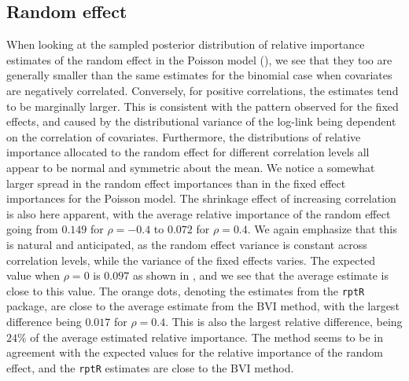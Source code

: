 \subsection{Random effect}
When looking at the sampled posterior distribution of relative importance estimates of the random effect in the Poisson model (), we see that they too are generally smaller than the same estimates for the binomial case when covariates are negatively correlated. Conversely, for positive correlations, the estimates tend to be marginally larger. This is consistent with the pattern observed for the fixed effects, and caused by the distributional variance of the log-link being dependent on the correlation of covariates. Furthermore, the distributions of relative importance allocated to the random effect for different correlation levels all appear to be normal and symmetric about the mean. We notice a somewhat larger spread in the random effect importances than in the fixed effect importances for the Poisson model. The shrinkage effect of increasing correlation is also here apparent, with the average relative importance of the random effect going from $0.149$ for $\rho=-0.4$ to $0.072$ for $\rho=0.4$. We again emphasize that this is natural and anticipated, as the random effect variance is constant across correlation levels, while the variance of the fixed effects varies. The expected value when $\rho=0$ is $0.097$ as shown in , and we see that the average estimate is close to this value. The orange dots, denoting the estimates from the \texttt{rptR} package, are close to the average estimate from the BVI method, with the largest difference being $0.017$ for $\rho=0.4$. This is also the largest relative difference, being $24\%$ of the average estimated relative importance. The method seems to be in agreement with the expected values for the relative importance of the random effect, and the \texttt{rptR} estimates are close to the BVI method.
